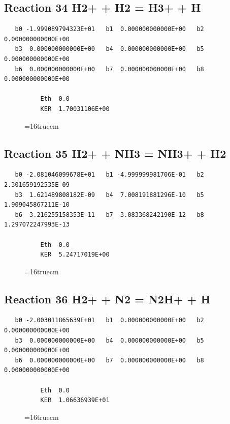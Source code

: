 \documentclass[12pt,dvipdfm]{article}
\begin{document}
\subsection{
Reaction 34 H2+ + H2 = H3+ + H }
\begin{small}\begin{verbatim}
   b0 -1.999089794323E+01   b1  0.000000000000E+00   b2  0.000000000000E+00
   b3  0.000000000000E+00   b4  0.000000000000E+00   b5  0.000000000000E+00
   b6  0.000000000000E+00   b7  0.000000000000E+00   b8  0.000000000000E+00

          Eth  0.0
          KER  1.70031106E+00
\end{verbatim}\end{small}
\begin{figure}[h!] \label{n2rates}
\epsfxsize=16truecm
\end{figure}
\newpage

\subsection{
Reaction 35 H2+ + NH3 = NH3+ + H2 }
\begin{small}\begin{verbatim}
   b0 -2.081046099678E+01   b1 -4.999999981706E-01   b2  2.301659192535E-09
   b3  1.621489808182E-09   b4  7.008191881296E-10   b5  1.909045867211E-10
   b6  3.216255158353E-11   b7  3.083368242190E-12   b8  1.297072247993E-13

          Eth  0.0
          KER  5.24717019E+00
\end{verbatim}\end{small}
\begin{figure}[h!] \label{n2rates}
\epsfxsize=16truecm
\end{figure}
\newpage

\subsection{
Reaction 36 H2+ + N2 = N2H+ + H }
\begin{small}\begin{verbatim}
   b0 -2.003011865639E+01   b1  0.000000000000E+00   b2  0.000000000000E+00
   b3  0.000000000000E+00   b4  0.000000000000E+00   b5  0.000000000000E+00
   b6  0.000000000000E+00   b7  0.000000000000E+00   b8  0.000000000000E+00

          Eth  0.0
          KER  1.06636939E+01
\end{verbatim}\end{small}
\begin{figure}[h!] \label{n2rates}
\epsfxsize=16truecm
\end{figure}
\newpage
\end{document}
